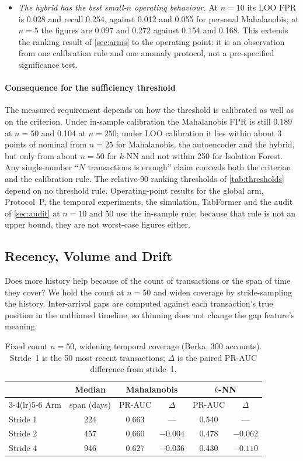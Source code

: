 \begin{itemize}
\item \emph{The hybrid has the best small-$n$ operating behaviour.} At $n=10$ its LOO FPR is 0.028 and recall 0.254, against 0.012 and 0.055 for personal Mahalanobis; at $n=5$ the figures are 0.097 and 0.272 against 0.154 and 0.168. This extends the ranking result of \cref{sec:arms} to the operating point; it is an observation from one calibration rule and one anomaly protocol, not a pre-specified significance test.
\end{itemize}

\paragraph{Consequence for the sufficiency threshold}
The measured requirement depends on how the threshold is calibrated as well as on the criterion. Under in-sample calibration the Mahalanobis FPR is still 0.189 at $n=50$ and 0.104 at $n=250$; under LOO calibration it lies within about 3 points of nominal from $n=25$ for Mahalanobis, the autoencoder and the hybrid, but only from about $n=50$ for $k$-NN and not within 250 for Isolation Forest. Any single-number ``$N$ transactions is enough'' claim conceals both the criterion and the calibration rule. The relative-90 ranking thresholds of \cref{tab:thresholds} depend on no threshold rule. Operating-point results for the global arm, Protocol~P, the temporal experiments, the simulation, TabFormer and the audit of \cref{sec:audit} at $n=10$ and 50 use the in-sample rule; because that rule is not an upper bound, they are not worst-case figures either.

\subsection{Recency, Volume and Drift}\label{sec:recency}

Does more history help because of the count of transactions or the span of time they cover? We hold the count at $n=50$ and widen coverage by stride-sampling the history. Inter-arrival gaps are computed against each transaction's true position in the unthinned timeline, so thinning does not change the gap feature's meaning.

\begin{table}[!t]
\caption{Fixed count $n=50$, widening temporal coverage (Berka, 300 accounts). Stride~1 is the 50 most recent transactions; $\Delta$ is the paired PR-AUC difference from stride~1.}
\label{tab:stride}
\centering\footnotesize\setlength{\tabcolsep}{4pt}
\begin{tabular}{l c cc cc}
\toprule
 & Median & \multicolumn{2}{c}{Mahalanobis} & \multicolumn{2}{c}{$k$-NN} \\
\cmidrule(lr){3-4}\cmidrule(lr){5-6}
Arm & span (days) & PR-AUC & $\Delta$ & PR-AUC & $\Delta$ \\
\midrule
Stride 1 & 224 & 0.663 & --- & 0.540 & --- \\
Stride 2 & 457 & 0.660 & $-0.004$ & 0.478 & $-0.062$ \\
Stride 4 & 946 & 0.627 & $-0.036$ & 0.430 & $-0.110$ \\
\bottomrule
\end{tabular}
\end{table}

